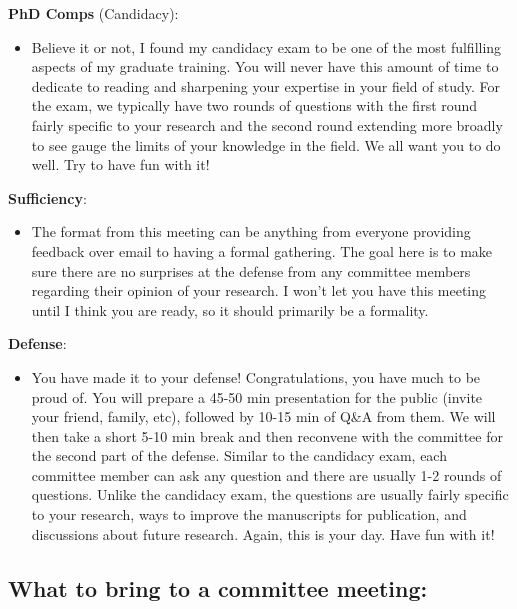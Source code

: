 \documentclass[
]{article}
\providecommand{\tightlist}{%
  \setlength{\itemsep}{0pt}\setlength{\parskip}{0pt}}
\begin{document}
\textbf{PhD Comps} (Candidacy):

\begin{itemize}
\tightlist
\item
  Believe it or not, I found my candidacy exam to be one of the most fulfilling aspects of my graduate training. You will never have this amount of time to dedicate to reading and sharpening your expertise in your field of study. For the exam, we typically have two rounds of questions with the first round fairly specific to your research and the second round extending more broadly to see gauge the limits of your knowledge in the field. We all want you to do well. Try to have fun with it!
\end{itemize}

\textbf{Sufficiency}:

\begin{itemize}
\tightlist
\item
  The format from this meeting can be anything from everyone providing feedback over email to having a formal gathering. The goal here is to make sure there are no surprises at the defense from any committee members regarding their opinion of your research. I won't let you have this meeting until I think you are ready, so it should primarily be a formality.
\end{itemize}

\textbf{Defense}:

\begin{itemize}
\tightlist
\item
  You have made it to your defense! Congratulations, you have much to be proud of. You will prepare a 45-50 min presentation for the public (invite your friend, family, etc), followed by 10-15 min of Q\&A from them. We will then take a short 5-10 min break and then reconvene with the committee for the second part of the defense. Similar to the candidacy exam, each committee member can ask any question and there are usually 1-2 rounds of questions. Unlike the candidacy exam, the questions are usually fairly specific to your research, ways to improve the manuscripts for publication, and discussions about future research. Again, this is your day. Have fun with it!
\end{itemize}

\hypertarget{what-to-bring-to-a-committee-meeting}{%
\subsection{What to bring to a committee meeting:}\label{what-to-bring-to-a-committee-meeting}}
\end{document}
